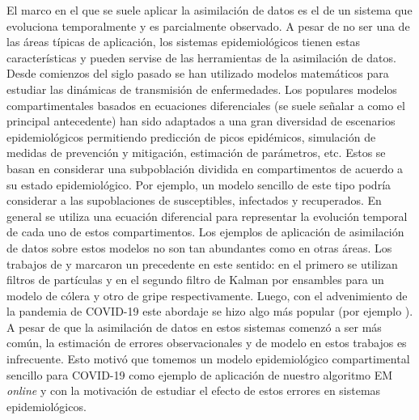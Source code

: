El marco en el que se suele aplicar la asimilación de datos es el de un sistema que evoluciona temporalmente y es parcialmente observado. A pesar de no ser una de las áreas típicas de aplicación, los sistemas epidemiológicos tienen estas características y pueden servise de las herramientas de la asimilación de datos. Desde comienzos del siglo pasado se han utilizado modelos matemáticos para estudiar las dinámicas de transmisión de enfermedades. Los populares modelos compartimentales basados en ecuaciones diferenciales (se suele señalar a \cite{Kermack1927} como el principal antecedente) han sido adaptados a una gran diversidad de escenarios epidemiológicos permitiendo predicción de picos epidémicos, simulación de medidas de prevención y mitigación, estimación de parámetros, etc. Estos se basan en considerar una subpoblación dividida en compartimentos de acuerdo a su estado epidemiológico. Por ejemplo, un modelo sencillo de este tipo podría considerar a las supoblaciones de susceptibles, infectados y recuperados. En general se utiliza una ecuación diferencial para representar la evolución temporal de cada uno de estos compartimentos. Los ejemplos de aplicación de asimilación de datos sobre estos modelos no son tan abundantes como en otras áreas. Los trabajos de \cite{Ionides2006} y \cite{Shaman2012} marcaron un precedente en este sentido: en el primero se utilizan filtros de partículas y en el segundo filtro de Kalman por ensambles para un modelo de cólera y otro de gripe respectivamente. Luego, con el advenimiento de la pandemia de COVID-19 este abordaje se hizo algo más popular (por ejemplo \cite{Evensen2020, Li2020}). A pesar de que la asimilación de datos en estos sistemas comenzó a ser más común, la estimación de errores observacionales y de modelo en estos trabajos es infrecuente. Esto motivó que tomemos un modelo epidemiológico compartimental sencillo para COVID-19 como ejemplo de aplicación de nuestro algoritmo EM \textit{online} y con la motivación de estudiar el efecto de estos errores en sistemas epidemiológicos.

